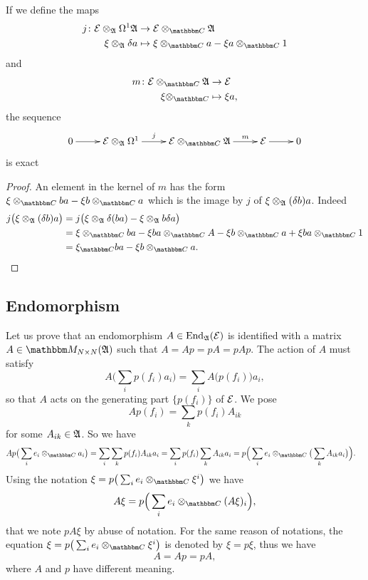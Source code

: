 \begin{proposition}
If we define the maps
\begin{equation}
\begin{aligned}
 j\colon \modE\otimes_{\cA}\Omega^1\cA&\to \modE\otimes_{\eC}\cA \\ 
   \xi\otimes_{\cA}\delta a&\mapsto \xi\otimes_{\eC}a-\xi a\otimes_{\eC}1 
\end{aligned}
\end{equation}
and
\begin{equation}
\begin{aligned}
 m\colon \modE\otimes_{\eC}\cA&\to \modE \\ 
   \xi\otimes_{\eC}&\mapsto \xi a, 
\end{aligned}
\end{equation}
the sequence
\[ 
\xymatrix{%
   0 \ar[r]		&	\modE\otimes_{\cA}\Omega^1\ar[r]^-j	&  \modE\otimes_{\eC}\cA\ar[r]^-m	&\modE\ar[r]	&0
}
\]
is exact
\end{proposition}

\begin{proof}
An element in the kernel of $m$ has the form $\xi\otimes_{\eC}ba-\xi b\otimes_{\eC}a$ which is the image by $j$ of $\xi\otimes_{\mathfrak{A}}(\delta b)a$. Indeed
\begin{align*}
j\big( \xi\otimes_{\cA}(\delta b)a \big)	&=j\big( \xi\otimes_{\cA}\delta(ba)-\xi\otimes_{\cA}b\delta a \big)\\
						&=\xi\otimes_{\eC}ba-\xi ba\otimes_{\eC}A-\xi b\otimes_{\eC}a+\xi ba\otimes_{\eC}1\\
						&=\xi_{\eC}ba-\xi b\otimes_{\eC} a.
\end{align*}
\end{proof}

\subsection{Endomorphism}

Let us prove that an endomorphism $A\in\operatorname{End}_{\mathfrak{A}}(\mathcal{E})$ is identified with a matrix $A\in\eM_{N\times N}(\cA)$ such that $A=Ap=pA=pAp$. The action of $A$ must satisfy
\[ 
  A\big( \sum_ip(f_i)a_i \big)=\sum_iA\big( p(f_i) \big)a_i,
\]
so that $A$ acts on the generating part $\{ p(f_i) \}$ of $\mathcal{E}$. We pose 
\begin{equation}
  Ap(f_i)=\sum_kp(f_i)A_{ik}
\end{equation}
for some $A_{ik}\in\mathfrak{A}$. So we have
\begin{align*}
  Ap\big( \sum_ie_i\otimes_{\eC}a_i \big)&=\sum_i\sum_kp(f_i)A_{ik}a_i
				=\sum_ip(f_i)\sum_kA_{ik}a_i
				=p\Big( \sum_ie_i\otimes_{\eC}\big( \sum_kA_{ik}a_i \big) \Big).
\end{align*}
Using the notation $\xi=p\big( \sum_ie_i\otimes_{\eC}\xi^i \big)$ we have
\begin{equation}
A\xi=p\Big( \sum_ie_i\otimes_{\eC}(A\xi)_i \Big),
\end{equation}
that we note $pA\xi$ by abuse of notation. For the same reason of notations, the equation $\xi=p\big( \sum_ie_i\otimes_{\eC}\xi^i \big)$ is denoted by $\xi=p\xi$, thus we have
\[ 
  A=Ap=pA,
\]
where $A$ and $p$ have different meaning.


